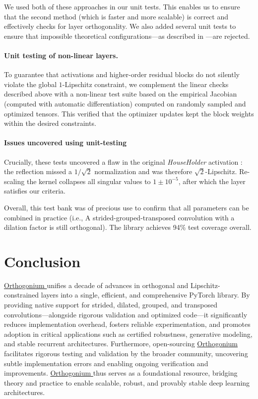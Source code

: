 \documentclass[10pt]{article}
\theoremstyle{plain}
\theoremstyle{definition}
\theoremstyle{remark}
\newcommand{\Orthogonium}{ \href{https://github.com/deel-ai/orthogonium/}{Orthogonium }}
\begin{document}
    We used both of these approaches in our unit tests. This enables us to ensure that the second method (which is faster and more scalable) is correct and effectively checks for layer orthogonality. We also added several unit tests to ensure that impossible theoretical configurations—as described in \cite{achour2022existence}—are rejected.

    \paragraph{Unit testing of non-linear layers.}
    To guarantee that activations and higher-order residual blocks do not silently violate the global $1$-Lipschitz constraint, we complement the linear checks described above with a non-linear test suite based on the empirical Jacobian (computed with automatic differentiation) computed on randomly sampled and optimized tensors. This verified that the optimizer updates kept the block weights within the desired constraints.

    \paragraph{Issues uncovered using unit-testing}
    Crucially, these tests uncovered a flaw in the original \emph{HouseHolder} activation \cite{singla_improved_2022}: the reflection missed a $1/\sqrt{2}$ normalization and was therefore $\sqrt{2}$-Lipschitz. Re-scaling the kernel collapses all singular values to $1\pm10^{-5}$, after which the layer satisfies our criteria.  
    
    Overall, this test bank was of precious use to confirm that all parameters can be combined in practice (i.e., A strided-grouped-transposed convolution with a dilation factor is still orthogonal). The library achieves 94\% test coverage overall.



\section{Conclusion}

\Orthogonium unifies a decade of advances in orthogonal and Lipschitz-constrained layers into a single, efficient, and comprehensive PyTorch library. By providing native support for strided, dilated, grouped, and transposed convolutions—alongside rigorous validation and optimized code—it significantly reduces implementation overhead, fosters reliable experimentation, and promotes adoption in critical applications such as certified robustness, generative modeling, and stable recurrent architectures. Furthermore, open-sourcing \Orthogonium facilitates rigorous testing and validation by the broader community, uncovering subtle implementation errors and enabling ongoing verification and improvements. \Orthogonium thus serves as a foundational resource, bridging theory and practice to enable scalable, robust, and provably stable deep learning architectures.
\end{document}
